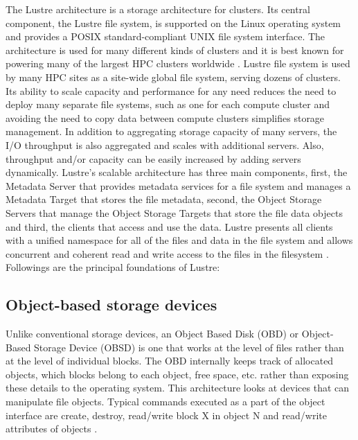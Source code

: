 \documentclass[9pt,twocolumn,twoside]{../../styles/osajnl}
\begin{document}
The Lustre architecture is a storage architecture for clusters. Its
central component, the Lustre file system, is supported on the Linux
operating system and provides a POSIX standard-compliant UNIX file
system interface. The architecture is used for many different kinds of
clusters and it is best known for powering many of the largest HPC
clusters worldwide \cite{www-manual}. Lustre file system is used by
many HPC sites as a site-wide global file system, serving dozens of
clusters. Its ability to scale capacity and performance for any need
reduces the need to deploy many separate file systems, such as one for
each compute cluster and avoiding the need to copy data between
compute clusters simplifies storage management. In addition to
aggregating storage capacity of many servers, the I/O throughput is
also aggregated and scales with additional servers. Also, throughput
and/or capacity can be easily increased by adding servers
dynamically. Lustre’s scalable architecture has three main components,
first, the Metadata Server that provides metadata services for a file
system and manages a Metadata Target that stores the file metadata,
second, the Object Storage Servers that manage the Object Storage
Targets that store the file data objects and third, the clients that
access and use the data. Lustre presents all clients with a unified
namespace for all of the files and data in the file system and allows
concurrent and coherent read and write access to the files in the
filesystem \cite{www-getstart}.
\newline
Followings are the principal foundations of Lustre: 

\subsection{Object-based storage devices}
Unlike conventional storage devices, an Object Based Disk (OBD) or
Object-Based Storage Device (OBSD) is one that works at the level of
files rather than at the level of individual blocks. The OBD
internally keeps track of allocated objects, which blocks belong to
each object, free space, etc. rather than exposing these details to
the operating system. This architecture looks at devices that can
manipulate file objects. Typical commands executed as a part of the
object interface are create, destroy, read/write block X in object N
and read/write attributes of objects \cite{www-obd-wikipedia}.
\end{document}

